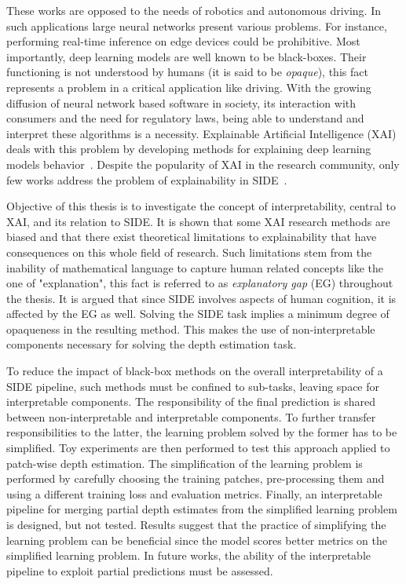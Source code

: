 These works are opposed to the needs of robotics and autonomous driving.
In such applications large neural networks present various problems.
For instance, performing real-time inference on edge devices could be prohibitive.
Most importantly, deep learning models are well known to be black-boxes.
Their functioning is not understood by humans (it is said to be \textit{opaque}), this fact represents a problem in a critical application like driving.
With the growing diffusion of neural network based software in society, its interaction with consumers and the need for regulatory laws, being able to understand and interpret these algorithms is a necessity.
Explainable Artificial Intelligence (XAI) deals with this problem by developing methods for explaining deep learning models behavior~\cite{XAI_review}.
Despite the popularity of XAI in the research community, only few works address the problem of explainability in SIDE~\cite{Hu, Dijk, towards_interpretable}.

Objective of this thesis is to investigate the concept of interpretability, central to XAI, and its relation to SIDE.
It is shown that some XAI research methods are biased and that there exist theoretical limitations to explainability that have consequences on this whole field of research.
Such limitations stem from the inability of mathematical language to capture human related concepts like the one of "explanation", this fact is referred to as \textit{explanatory gap} (EG) throughout the thesis.
It is argued that since SIDE involves aspects of human cognition, it is affected by the EG as well.
Solving the SIDE task implies a minimum degree of opaqueness in the resulting method.
This makes the use of non-interpretable components necessary for solving the depth estimation task.

To reduce the impact of black-box methods on the overall interpretability of a SIDE pipeline, such methods must be confined to sub-tasks, leaving space for interpretable components.
The responsibility of the final prediction is shared between non-interpretable and interpretable components.
To further transfer responsibilities to the latter, the learning problem solved by the former has to be simplified.
Toy experiments are then performed to test this approach applied to patch-wise depth estimation.
The simplification of the learning problem is performed by carefully choosing the training patches, pre-processing them and using a different training loss and evaluation metrics. 
Finally, an interpretable pipeline for merging partial depth estimates from the simplified learning problem is designed, but not tested.
Results suggest that the practice of simplifying the learning problem can be beneficial since the model scores better metrics on the simplified learning problem.
In future works, the ability of the interpretable pipeline to exploit partial predictions must be assessed.


